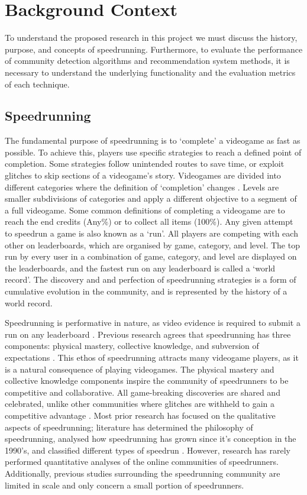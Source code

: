 \section{Background Context}

To understand the proposed research in this project we must discuss the history, purpose, and concepts of speedrunning. Furthermore, to evaluate the performance of community detection algorithms and recommendation system methods, it is necessary to understand the underlying functionality and the evaluation metrics of each technique. 

\subsection{Speedrunning}

The fundamental purpose of speedrunning is to `complete' a videogame as fast as possible. To achieve this, players use specific strategies to reach a defined point of completion. Some strategies follow unintended routes to save time, or exploit glitches to skip sections of a videogame's story. Videogames are divided into different categories where the definition of `completion' changes \cite{Hemmingsen}. Levels are smaller subdivisions of categories and apply a different objective to a segment of a full videogame. Some common definitions of completing a videogame are to reach the end credits (Any\%) or to collect all items (100\%). Any given attempt to speedrun a game is also known as a `run'. All players are competing with each other on leaderboards, which are organised by game, category, and level. The top run by every user in a combination of game, category, and level are displayed on the leaderboards, and the fastest run on any leaderboard is called a `world record'. The discovery and and perfection of speedrunning strategies is a form of cumulative evolution in the community, and is represented by the history of a world record.


Speedrunning is performative in nature, as video evidence is required to submit a run on any leaderboard \cite{ScullyBlaker}. Previous research agrees that speedrunning has three components: physical mastery, collective knowledge, and subversion of expectations \cite{Hemmingsen, ScullyBlaker}. This ethos of speedrunning attracts many videogame players, as it is a natural consequence of playing videogames. The physical mastery and collective knowledge components inspire the community of speedrunners to be competitive and collaborative. All game-breaking discoveries are shared and celebrated, unlike other communities where glitches are withheld to gain a competitive advantage \cite{ScullyBlaker}. Most prior research has focused on the qualitative aspects of speedrunning; literature has determined the philosophy of speedrunning, analysed how speedrunning has grown since it's conception in the 1990's, and classified different types of speedrun \cite{ScullyBlaker, Hemmingsen, scully2014practiced}. However, research has rarely performed quantitative analyses of the online communities of speedrunners. Additionally, previous studies surrounding the speedrunning community are limited in scale and only concern a small portion of speedrunners.

